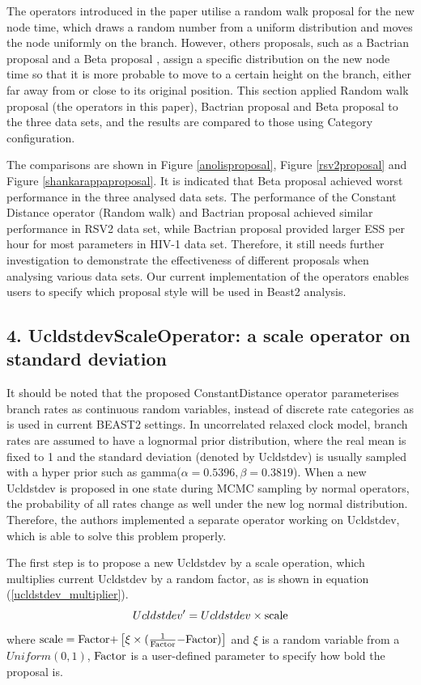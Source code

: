 \documentclass{bmcart}
\begin{document}
\begin{backmatter}
The operators introduced in the paper utilise a random walk proposal for the new node time, which draws a random number from a uniform distribution and moves the node uniformly on the branch. However, others proposals, such as a Bactrian proposal \cite{Yang19307} and a Beta proposal \cite{betaproposal}, assign a specific distribution on the new node time so that it is more probable to move to a certain height on the branch, either far away from or close to its original position. This section applied Random walk proposal (the operators in this paper), Bactrian proposal and Beta proposal to the three data sets, and the results are compared to those using Category configuration.

The comparisons are shown in Figure \ref{anolisproposal}, Figure \ref{rsv2proposal} and Figure \ref{shankarappaproposal}. It is indicated that Beta proposal achieved worst performance in the three analysed data sets. The performance of the Constant Distance operator (Random walk) and Bactrian proposal achieved similar performance in RSV2 data set, while Bactrian proposal provided larger ESS per hour for most parameters in HIV-1 data set. Therefore, it still needs further investigation to demonstrate the effectiveness of different proposals when analysing various data sets. Our current implementation of the operators enables users to specify which proposal style will be used in Beast2 analysis.

\subsection*{4. UcldstdevScaleOperator: a scale operator on standard deviation}\label{UcldstdevScaler}

It should be noted that the proposed ConstantDistance operator parameterises branch rates as continuous random variables, instead of discrete rate categories as is used in current BEAST2 settings. In uncorrelated relaxed clock model, branch rates are assumed to have a lognormal prior distribution, where the real mean is fixed to 1 and the standard deviation (denoted by Ucldstdev) is usually sampled with a hyper prior such as gamma($\alpha = 0.5396, \beta = 0.3819$). When a new Ucldstdev is proposed in one state during MCMC sampling by normal operators, the probability of all rates change as well under the new log normal distribution. Therefore, the authors implemented a separate operator working on Ucldstdev, which is able to solve this problem properly. 

The first step is to propose a new Ucldstdev by a scale operation, which multiplies  current Ucldstdev by a random factor, as is shown in equation (\ref{ucldstdev_multiplier}).
\begin{equation}\label{ucldstdev_multiplier}
Ucldstdev' = Ucldstdev \times {\rm{scale}}
\end{equation}
where ${\rm{scale = Factor  +  }}\left[ {\xi  \times {\rm{(}}\frac{1}{{{\rm{Factor}}}}{\rm{  -  Factor)}}} \right]$ and  $\xi$ is a random variable from a $Uniform(0,1)$,  ${\rm{Factor}}$ is a user-defined parameter to specify how bold the proposal is.


\end{backmatter}
\end{document}
